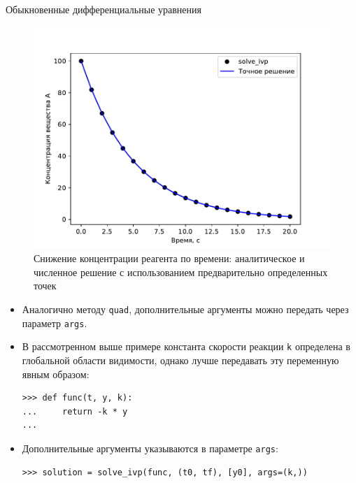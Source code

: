 \documentclass[aspectratio=169, mathserif]{beamer}	%
\begin{document}
\begin{frame}[fragile, label=c]{Обыкновенные дифференциальные уравнения}
\scriptsize
\begin{minipage}{.58\textwidth}
\begin{figure}[h!]
	\centering
	\includegraphics[width=.92\linewidth]{./pics/Figure_35}
	\caption{Снижение концентрации реагента по времени: аналитическое и численное решение с использованием предварительно определенных точек}
\end{figure}
\end{minipage}
\begin{minipage}{.415\textwidth}
\begin{itemize}
	\item Аналогично методу \texttt{quad}, дополнительные аргументы можно передать через параметр \texttt{args}.
	\item В рассмотренном выше примере константа скорости реакции \texttt{k} определена в глобальной области видимости, однако лучше передавать эту переменную явным образом:

\begin{verbatim}
>>> def func(t, y, k):
...     return -k * y
...
\end{verbatim}
\end{itemize}
\end{minipage}
\begin{itemize}
	\item Дополнительные аргументы указываются в параметре \texttt{args}:
\vfill
\begin{verbatim}
>>> solution = solve_ivp(func, (t0, tf), [y0], args=(k,))
\end{verbatim}
\end{itemize}
\vfill
\end{frame}
\end{document}
